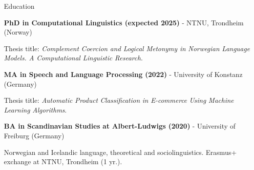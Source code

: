 \begin{rubric}{Education}

\entry*
	\textbf{PhD in Computational Linguistics (expected 2025)} - NTNU, Trondheim (Norway)\par
    Thesis title: \emph{Complement Coercion and Logical Metonymy in Norwegian Language Models. A Computational Linguistic Research.} \par
    
    
\entry*
	\textbf{MA in Speech and Language Processing (2022)} - University of Konstanz (Germany)\par
    Thesis title: \emph{Automatic Product Classification in E-commerce Using Machine Learning Algorithms}. \par

    
\entry*%
	\textbf{BA in Scandinavian Studies at Albert-Ludwigs (2020)} - University of Freiburg (Germany) \par
    Norwegian and Icelandic language, theoretical and sociolinguistics.
	Erasmus+ exchange at NTNU, Trondheim (1 yr.).\par
\end{rubric}